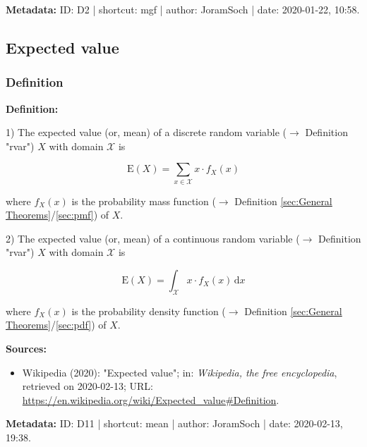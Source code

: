 \documentclass[a4paper,12pt]{book}
\begin{document}
\vspace{1em}
\textbf{Metadata:} ID: D2 | shortcut: mgf | author: JoramSoch | date: 2020-01-22, 10:58.


\subsection{Expected value}

\subsubsection[\textit{Definition}]{Definition} \label{sec:mean}

\vspace{1em}
\textbf{Definition:}

1) The expected value (or, mean) of a discrete random variable ($\rightarrow$ Definition "rvar") $X$ with domain $\mathcal{X}$ is

\begin{equation} \label{eq:mean-mean-disc}
\mathrm{E}(X) = \sum_{x \in \mathcal{X}} x \cdot f_X(x)
\end{equation}

where $f_X(x)$ is the probability mass function ($\rightarrow$ Definition \ref{sec:General Theorems}/\ref{sec:pmf}) of $X$.

\vspace{1em}
2) The expected value (or, mean) of a continuous random variable ($\rightarrow$ Definition "rvar") $X$ with domain $\mathcal{X}$ is

\begin{equation} \label{eq:mean-mean-cont}
\mathrm{E}(X) = \int_{\mathcal{X}} x \cdot f_X(x) \, \mathrm{d}x
\end{equation}

where $f_X(x)$ is the probability density function ($\rightarrow$ Definition \ref{sec:General Theorems}/\ref{sec:pdf}) of $X$.

\vspace{1em}
\textbf{Sources:}
\begin{itemize}
\item Wikipedia (2020): "Expected value"; in: \textit{Wikipedia, the free encyclopedia}, retrieved on 2020-02-13; URL: \url{https://en.wikipedia.org/wiki/Expected_value#Definition}.
\end{itemize}


\vspace{1em}
\textbf{Metadata:} ID: D11 | shortcut: mean | author: JoramSoch | date: 2020-02-13, 19:38.
\end{document}
